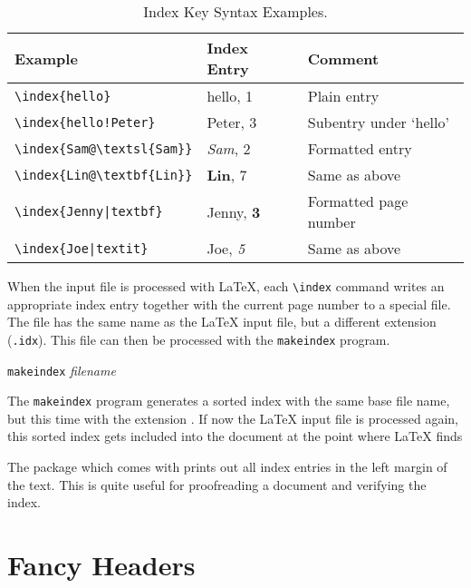 \begin{table}[!tp]
\caption{Index Key Syntax Examples.}
\label{index}
\begin{center}
\begin{tabular}{@{}lll@{}}
  \textbf{Example} &\textbf{Index Entry} &\textbf{Comment}\\\hline
  \rule{0pt}{1.05em}\verb|\index{hello}| &hello, 1 &Plain entry\\ 
\verb|\index{hello!Peter}|   &\hspace*{2ex}Peter, 3 &Subentry under `hello'\\ 
\verb|\index{Sam@\textsl{Sam}}|     &\textsl{Sam}, 2& Formatted entry\\ 
\verb|\index{Lin@\textbf{Lin}}|     &\textbf{Lin}, 7& Same as above\\ 
\verb.\index{Jenny|textbf}.     &Jenny, \textbf{3}& Formatted page number\\
\verb.\index{Joe|textit}.     &Joe, \textit{5}& Same as above
\end{tabular}
\end{center}
\end{table}

When the input file is processed with \LaTeX{}, each \verb|\index|
command writes an appropriate index entry together with the current
page number to a special file. The file has the same name as the
\LaTeX{} input file, but a different extension (\verb|.idx|). This
 file can then be processed with the \texttt{makeindex}
program.

\begin{lscommand}
  \texttt{makeindex} \emph{filename}
\end{lscommand}
The \texttt{makeindex} program generates a sorted index with the same base
file name, but this time with the extension . If now the
\LaTeX{} input file is processed again, this sorted index gets
included into the document at the point where \LaTeX{} finds
\begin{lscommand}
\end{lscommand}

The  package which comes with \LaTeXe{} prints out all
index entries in the left margin of the text. This is quite useful for
proofreading a document and verifying the index.
   
\section{Fancy Headers}
\label{sec:fancy}

